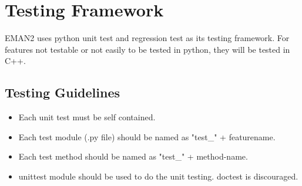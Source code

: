\section{Testing Framework}

EMAN2 uses python unit test and regression test as its testing
framework. For features not testable or not easily to be tested in
python, they will be tested in C++.


\subsection{Testing Guidelines}
    \begin{itemize}
      \item
        Each unit test must be self contained. 
      \item
	Each test module (.py file) should  be named as "test\_" +
	featurename.
      \item
	Each test method should be named as "test\_" + method-name.
      \item
	unittest module should be used to do the unit testing. doctest
	is discouraged.
    \end{itemize}

